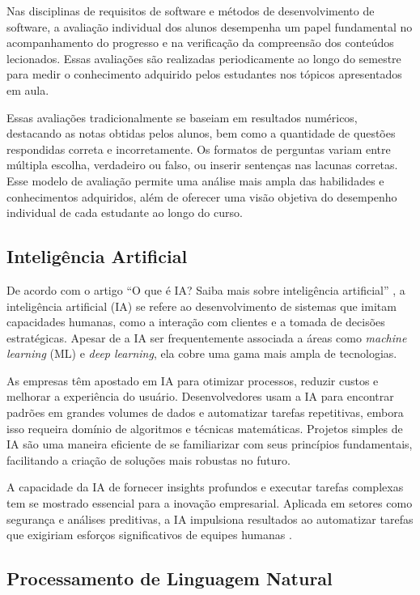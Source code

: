 Nas disciplinas de requisitos de software e métodos de desenvolvimento de software, a avaliação individual dos alunos desempenha um papel fundamental no acompanhamento do progresso e na verificação da compreensão dos conteúdos lecionados. Essas avaliações são realizadas periodicamente ao longo do semestre para medir o conhecimento adquirido pelos estudantes nos tópicos apresentados em aula.

Essas avaliações tradicionalmente se baseiam em resultados numéricos, destacando as notas obtidas pelos alunos, bem como a quantidade de questões respondidas correta e incorretamente. Os formatos de perguntas variam entre múltipla escolha, verdadeiro ou falso, ou inserir sentenças nas lacunas corretas. Esse modelo de avaliação permite uma análise mais ampla das habilidades e conhecimentos adquiridos, além de oferecer uma visão objetiva do desempenho individual de cada estudante ao longo do curso.

\subsection{Inteligência Artificial}

De acordo com o artigo ``O que é IA? Saiba mais sobre inteligência artificial'' \cite{oracleia2023}, a inteligência artificial (IA) se refere ao desenvolvimento de sistemas que imitam capacidades humanas, como a interação com clientes e a tomada de decisões estratégicas. Apesar de a IA ser frequentemente associada a áreas como \textit{machine learning} (ML) e \textit{deep learning}, ela cobre uma gama mais ampla de tecnologias.

As empresas têm apostado em IA para otimizar processos, reduzir custos e melhorar a experiência do usuário. Desenvolvedores usam a IA para encontrar padrões em grandes volumes de dados e automatizar tarefas repetitivas, embora isso requeira domínio de algoritmos e técnicas matemáticas. Projetos simples de IA são uma maneira eficiente de se familiarizar com seus princípios fundamentais, facilitando a criação de soluções mais robustas no futuro.

A capacidade da IA de fornecer insights profundos e executar tarefas complexas tem se mostrado essencial para a inovação empresarial. Aplicada em setores como segurança e análises preditivas, a IA impulsiona resultados ao automatizar tarefas que exigiriam esforços significativos de equipes humanas \cite{oracleia2023}.

\subsection{Processamento de Linguagem Natural}

